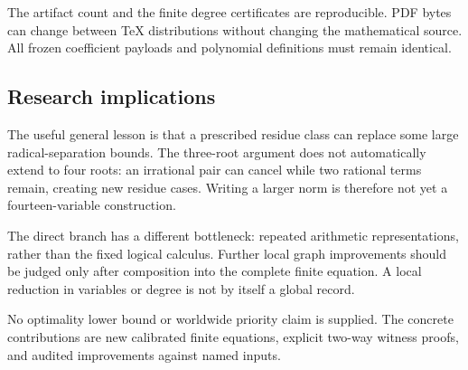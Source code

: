 \documentclass[11pt,letterpaper]{article}
\theoremstyle{remark}\newtheorem{remark}[theorem]{Remark}
\begin{document}
The artifact count and the finite degree certificates are reproducible.
PDF bytes can change between TeX distributions without changing the
mathematical source. All frozen coefficient payloads and polynomial
definitions must remain identical.

\subsection{Research implications}
The useful general lesson is that a prescribed residue class can replace
some large radical-separation bounds. The three-root argument does not
automatically extend to four roots: an irrational pair can cancel while
two rational terms remain, creating new residue cases. Writing a larger norm is therefore
not yet a fourteen-variable construction.

The direct branch has a different bottleneck: repeated arithmetic
representations, rather than the fixed logical calculus. Further local
graph improvements should be judged only after composition into the
complete finite equation. A local reduction in variables or degree is not
by itself a global record.

No optimality lower bound or worldwide priority claim is supplied.
The concrete contributions are new calibrated finite equations, explicit
two-way witness proofs, and audited improvements against named inputs.

\appendix
\end{document}
